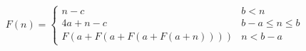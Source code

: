 \documentclass{article}
\begin{document}
    \begin{equation*}
        F(n) = \begin{cases}
            n - c & b < n \\
            4a+n-c & b - a \leq n \leq b \\
            F(a +F(a +F(a +F(a + n)))) &n < b - a
        \end{cases}
    \end{equation*}
\end{document}
